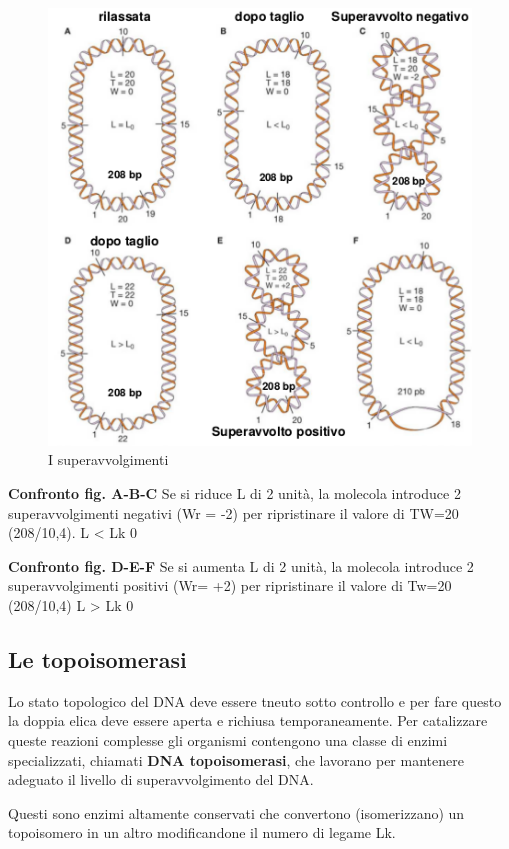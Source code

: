 \documentclass[11pt]{book}
\begin{document}
\clearpage
\begin{figure}[htp]
\centering
\includegraphics[scale=0.55]{img/02_Superavvolgimenti.png}
\caption{I superavvolgimenti}
\label{superavvolgimenti}
\end{figure}

\textbf{Confronto fig. A-B-C} Se si riduce L di 2 unità, la molecola
introduce 2 superavvolgimenti negativi (Wr = -2) per ripristinare il
valore di TW=20 (208/10,4). L \textless{} Lk 0

\textbf{Confronto fig. D-E-F} Se si aumenta L di 2 unità, la molecola
introduce 2 superavvolgimenti positivi (Wr= +2) per ripristinare il
valore di Tw=20 (208/10,4) L \textgreater{} Lk 0

\subsection{Le topoisomerasi}\label{le-topoisomerasi}

Lo stato topologico del DNA deve essere tneuto sotto controllo e per
fare questo la doppia elica deve essere aperta e richiusa
temporaneamente. Per catalizzare queste reazioni complesse gli organismi
contengono una classe di enzimi specializzati, chiamati \textbf{DNA
topoisomerasi}, che lavorano per mantenere adeguato il livello di
superavvolgimento del DNA.

Questi sono enzimi altamente conservati che convertono (isomerizzano) un
topoisomero in un altro modificandone il numero di legame Lk.
\end{document}
